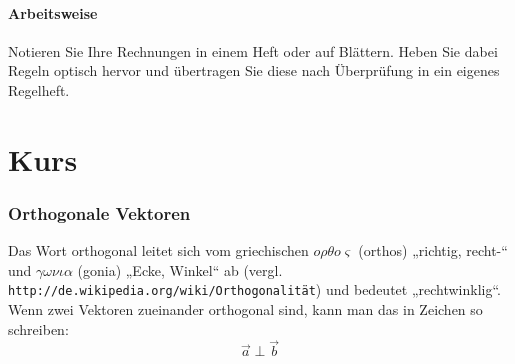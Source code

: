 \documentclass[12pt,a4paper,twoside,fleqn]{article}
\begin{document}
\subsection*{Arbeitsweise}
Notieren Sie Ihre Rechnungen in einem Heft oder auf Blättern. Heben
Sie dabei Regeln optisch hervor und übertragen Sie diese nach
Überprüfung in ein eigenes Regelheft.
\tableofcontents
\part{Kurs}
\section{Orthogonale Vektoren}
Das Wort orthogonal leitet sich vom griechischen
$o\rho\theta o\varsigma$  (orthos)
„richtig, recht-“ und $\gamma\omega\nu\iota\alpha$ (gonia) „Ecke, Winkel“ ab
(vergl. \texttt{http://de.wikipedia.org/wiki/Orthogonalität}) und
bedeutet „rechtwinklig“. Wenn zwei Vektoren zueinander orthogonal
sind, kann man das in Zeichen so schreiben: $$\vec{a}\perp\vec{b}$$
\end{document}
